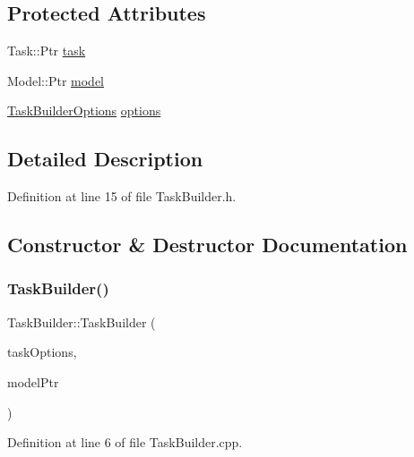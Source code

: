 \subsection*{Protected Attributes}
\begin{DoxyCompactItemize}
\item 
Task\+::\+Ptr \hyperlink{classocra_1_1TaskBuilder_ad3f099d23545d5d55d55ac2cf3d93b4d}{task}
\item 
Model\+::\+Ptr \hyperlink{classocra_1_1TaskBuilder_af612ab3b2881a7d472efabb650b23caf}{model}
\item 
\hyperlink{classocra_1_1TaskBuilderOptions}{Task\+Builder\+Options} \hyperlink{classocra_1_1TaskBuilder_a93ad03ab72579612f7ec5fe57b5df145}{options}
\end{DoxyCompactItemize}


\subsection{Detailed Description}


Definition at line 15 of file Task\+Builder.\+h.



\subsection{Constructor \& Destructor Documentation}
\hypertarget{classocra_1_1TaskBuilder_a47da2d3a4f793620895f5eda79ea80f6}{}\label{classocra_1_1TaskBuilder_a47da2d3a4f793620895f5eda79ea80f6} 
\subsubsection{\texorpdfstring{Task\+Builder()}{TaskBuilder()}}
{\footnotesize\ttfamily Task\+Builder\+::\+Task\+Builder (\begin{DoxyParamCaption}\item[{const \hyperlink{classocra_1_1TaskBuilderOptions}{Task\+Builder\+Options} \&}]{task\+Options,  }\item[{Model\+::\+Ptr}]{model\+Ptr }\end{DoxyParamCaption})}



Definition at line 6 of file Task\+Builder.\+cpp.

\hypertarget{classocra_1_1TaskBuilder_ac4a6e94f7e39db652819ebbd99e2a334}{}\label{classocra_1_1TaskBuilder_ac4a6e94f7e39db652819ebbd99e2a334} 
